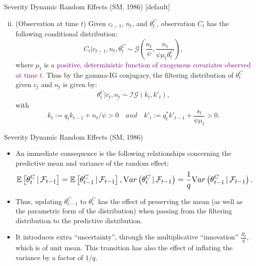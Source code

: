 \documentclass[ignorenonframetext,]{beamer}
\begin{document}
\begin{frame}{Severity Dynamic Random Effects (SM, 1986)}
[default]
\begin{enumerate}[i.]
\setcounter{enumi}{1}
\item (Observation at time $t$) Given $\underline{c_{t-1}}$, $\underline{n_t}$, and $\underline{\theta^C_t}$, observation $C_t$ has the following conditional distribution:
$$
C_t|\underline{c_{t-1}}, \underline{n_t}, \underline{\theta^C_t} \sim \mathcal{G}\left(\frac{n_t}{\psi}, \frac{n_t}{\psi\mu_t\theta^C_t}\right),
$$
where $\mu_t$ is a \textcolor{purple}{positive, deterministic function of exogenous covariates observed at time $t$}.
Thus by the gamma-IG conjugacy, the filtering distribution of $\theta^C_t$ given $\underline{c_t}$ and $\underline{n_t}$ is given by:
\begin{equation}\label{p3:sevfilt}
\theta^C_t|\underline{c_t}, \underline{n_t} \sim \mathcal{IG}\left(k_t, k'_t\right),
\end{equation}
with
$$
k_t := q_tk_{t-1} + n_t/\psi > 0 \quad and \quad k'_t := q^*_tk'_{t-1} + \frac{s_t}{\psi\mu_t} > 0.
$$
\end{enumerate}
\end{frame}

\begin{frame}{Severity Dynamic Random Effects (SM, 1986)}
\begin{itemize}
\item An immediate consequence is the following relationships concerning the predictive mean and variance of the random effect:
$$
\resizebox{\linewidth}{!}{$\displaystyle
\E{\theta^C_t \,|\, \mathcal{F}_{t-1}} = \E{\theta^C_{t-1} \,|\, \mathcal{F}_{t-1}}, \Var{\theta^C_t \,|\, \mathcal{F}_{t-1}} = \frac{1}{q}\Var{\theta^C_{t-1} \,|\, \mathcal{F}_{t-1}}.$}
$$
\item Thus, updating $\theta^C_{t-1}$ to $\theta^C_t$ has the effect of preserving the mean (as well as the parametric form of the distribution) when passing from the filtering distribution to the predictive distribution.
\item It introduces extra ``uncertainty'', through the multiplicative ``innovation'' $\frac{B_t}{q}$, which is of unit mean.
This transition has also the effect of inflating the variance by a factor of $1/q$.
\end{itemize}
\end{frame}
\end{document}
